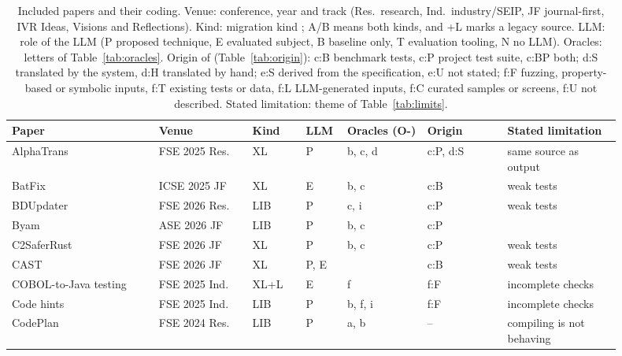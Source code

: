 \begin{table}[p]
  \centering
  \caption{Included papers and their coding. Venue: conference, year and track (Res.\ research, Ind.\ industry/SEIP, JF journal-first, IVR Ideas, Visions and Reflections). Kind: migration kind ; A/B means both kinds, and +L marks a legacy source. LLM: role of the LLM (P proposed technique, E evaluated subject, B baseline only, T evaluation tooling, N no LLM). Oracles: letters of Table~\ref{tab:oracles}. Origin of  (Table~\ref{tab:origin}): c:B benchmark tests, c:P project test suite, c:BP both; d:S translated by the system, d:H translated by hand; e:S  derived from the specification, e:U not stated; f:F fuzzing, property-based or symbolic inputs, f:T existing tests or data, f:L LLM-generated inputs, f:C curated samples or screens, f:U not described. Stated limitation: theme of Table~\ref{tab:limits}.}
  \label{tab:primary}
  \scriptsize
  \setlength{\tabcolsep}{3pt}
  \begin{tabular}{@{}P{0.22\linewidth} P{0.14\linewidth} P{0.08\linewidth} P{0.05\linewidth} P{0.12\linewidth} P{0.12\linewidth} P{0.17\linewidth}@{}}
    \toprule
    Paper & Venue & Kind & LLM & Oracles (O-) & Origin & Stated limitation \\
    \midrule
    AlphaTrans~\cite{alphatrans} & FSE 2025 Res. & XL & P & b, c, d & c:P, d:S & same source as output \\
    BatFix~\cite{batfix} & ICSE 2025 JF & XL & E & b, c & c:B & weak tests \\
    BDUpdater~\cite{bdupdater} & FSE 2026 Res. & LIB & P & c, i & c:P & weak tests \\
    Byam~\cite{byam} & ASE 2026 JF & LIB & P & b, c & c:P &  \\
    C2SaferRust~\cite{c2saferrust} & FSE 2026 JF & XL & P & b, c & c:P & weak tests \\
    CAST~\cite{cast} & FSE 2026 JF & XL & P, E &  & c:B & weak tests \\
    COBOL-to-Java testing~\cite{coboljava} & FSE 2025 Ind. & XL+L & E & f & f:F & incomplete checks \\
    Code hints~\cite{codehints} & FSE 2025 Ind. & LIB & P & b, f, i & f:F & incomplete checks \\
    CodePlan~\cite{codeplan} & FSE 2024 Res. & LIB & P & a, b & -- & compiling is not behaving \\

\end{tabular}
\end{table}
